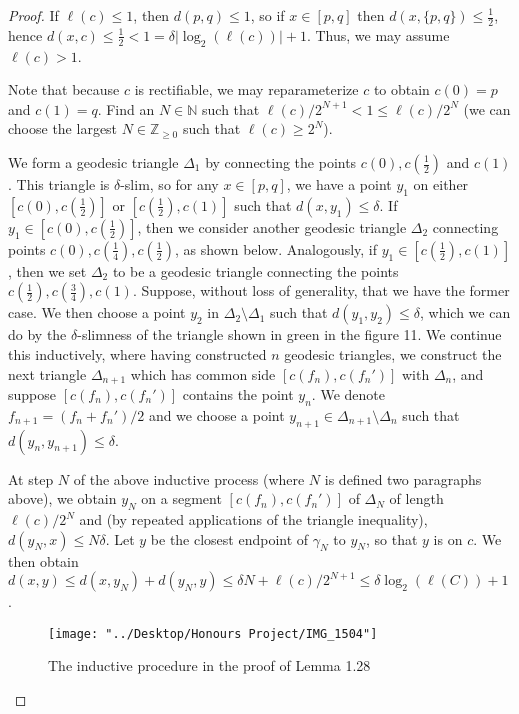 \documentclass[12pt]{article}
\newcommand{\vs}{\vskip10pt}
\begin{document}
	\begin{proof}
		
		
		\vs 
		
		If $\ell(c) \leq 1$, then $d(p,q) \leq 1$, so if $x \in [p,q]$ then $d(x, \{p,q\}) \leq \frac{1}{2}$, hence $d(x,c ) \leq \frac{1}{2} < 1 = \delta \vert \log_2 (\ell(c)) \vert + 1$. Thus, we may assume $\ell(c) > 1$.
		
		\vs 
		
		Note that because $c$ is rectifiable, we may reparameterize $c$ to obtain $c(0) = p$ and $c(1) = q$. Find an $N \in \mathbb{N}$ such that $\ell(c)/2^{N+1} < 1 \leq \ell(c)/2^N$ (we can choose the largest $N \in \mathbb{Z}_{\geq 0}$ such that $\ell(c) \geq 2^N$). 
		
		\vs 
		
		We form a geodesic triangle $\Delta_1$ by connecting the points $c(0), c(\frac{1}{2})$ and $c(1)$. This triangle is $\delta$-slim, so for any $x \in [p,q]$, we have a point $y_1$ on either $[c(0), c(\frac{1}{2})]$ or $[c(\frac{1}{2}), c(1)]$ such that $d(x,y_1) \leq \delta$. If $y_1 \in [c(0), c(\frac{1}{2})]$, then we consider another geodesic triangle $\Delta_2$ connecting points $c(0), c(\frac{1}{4}), c(\frac{1}{2})$, as shown below. Analogously, if $y_1 \in [c(\frac{1}{2}), c(1)]$, then we set $\Delta_2$ to be a geodesic triangle connecting the points $c(\frac{1}{2}), c(\frac{3}{4}), c(1)$. Suppose, without loss of generality, that we have the former case. We then choose a point $y_2$ in $\Delta_2 \setminus \Delta_1$ such that $d(y_1, y_2) \leq \delta$, which we can do by the $\delta$-slimness of the triangle shown in green in the figure 11. We continue this inductively, where having constructed $n$ geodesic triangles, we construct the next triangle $\Delta_{n+1}$ which has common side $[c(f_n), c(f_n')]$ with $\Delta_n$, and suppose $[c(f_n), c(f_n')]$ contains the point $y_n$. We denote $f_{n+1} = (f_n + f_n')/2$ and we choose a point $y_{n+1} \in \Delta_{n+1} \setminus \Delta_n$ such that $d(y_n, y_{n+1}) \leq \delta$. 
		
		\vs 
		
		At step $N$ of the above inductive process (where $N$ is defined two paragraphs above), we obtain $y_N$ on a segment $[c(f_n), c(f_n')]$ of $\Delta_{N}$ of length $\ell(c)/2^N$ and (by repeated applications of the triangle inequality), $d(y_N, x) \leq N \delta$. Let $y$ be the closest endpoint of $\gamma_N$ to $y_N$, so that $y$ is on $c$. We then obtain $d(x,y) \leq d(x, y_N) + d(y_N, y) \leq \delta N + \ell(c)/2^{N+1} \leq \delta \log_2 (\ell(C)) +1$. 
		
\begin{figure} [H]
	\centering
	\texttt{[image: "../Desktop/Honours Project/IMG\_1504"]}
	\caption{The inductive procedure in the proof of Lemma 1.28}
	\label{fig:img1504}
\end{figure}
		 		
	\end{proof}
	
\end{document}
